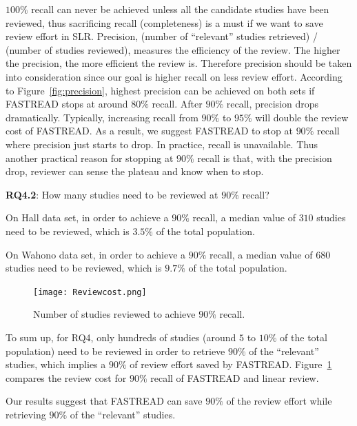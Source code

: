 \documentclass[final,twocolumn,5p]{elsarticle}
\theoremstyle{break}
\begin{document}
$100\%$ recall can never be achieved unless all the candidate studies have been reviewed, thus sacrificing recall (completeness) is a must if we want to save review effort in SLR. Precision, (number of ``relevant'' studies retrieved) / (number of studies reviewed), measures the efficiency of the review. The higher the precision, the more efficient the review is. Therefore precision should be taken into consideration since our goal is higher recall on less review effort. According to Figure~\ref{fig:precision}, highest precision can be achieved on both sets if FASTREAD stops at around $80\%$ recall. After $90\%$ recall, precision drops dramatically. Typically, increasing recall from $90\%$ to $95\%$ will double the review cost of FASTREAD. As a result, we suggest FASTREAD to stop at $90\%$ recall where precision just starts to drop. In practice, recall is unavailable. Thus another practical reason for stopping at $90\%$ recall is that, with the precision drop, reviewer can sense the plateau and know when to stop. 

\textbf{RQ4.2}: How many studies need to be reviewed at $90\%$ recall?

On Hall data set, in order to achieve a $90\%$ recall, a median value of $310$ studies need to be reviewed, which is $3.5\%$ of the total population.

On Wahono data set, in order to achieve a $90\%$ recall, a median value of $680$ studies need to be reviewed, which is $9.7\%$ of the total population.


\begin{figure}[th]
    \centering
    \texttt{[image: Reviewcost.png]}    
    \caption{Number of studies reviewed to achieve $90\%$ recall.}
    \label{fig:reviewcost}
\end{figure}

To sum up, for RQ4, only hundreds of studies (around $5$ to $10\%$ of the total population) need to be reviewed in order to retrieve $90\%$ of the ``relevant'' studies, which implies a $90\%$ of review effort saved by FASTREAD. Figure~\ref{fig:reviewcost} compares the review cost for $90\%$ recall of FASTREAD and linear review.

\begin{lesson}
    Our results suggest that FASTREAD can save $90\%$ of the review effort while retrieving $90\%$ of the ``relevant'' studies.
\end{lesson}
\end{document}

